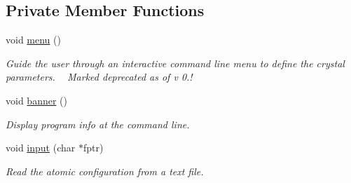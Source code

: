 \subsection*{Private Member Functions}
\begin{DoxyCompactItemize}
\item 
void \hyperlink{class_i_n_t_e_r_f_a_c_e_a4ae48a495e45c6a6a60cd3807209c851}{menu} ()
\begin{DoxyCompactList}\small\item\em Guide the user through an interactive command line menu to define the crystal parameters. ~\newline
Marked deprecated as of v 0.! \end{DoxyCompactList}\item 
void \hyperlink{class_i_n_t_e_r_f_a_c_e_a2e2b70933b201b9f06ef12fc0f126035}{banner} ()
\begin{DoxyCompactList}\small\item\em Display program info at the command line. \end{DoxyCompactList}\item 
void \hyperlink{class_i_n_t_e_r_f_a_c_e_ae27d0174983d1e7fee1291e53858dc55}{input} (char $\ast$fptr)
\begin{DoxyCompactList}\small\item\em Read the atomic configuration from a text file. \end{DoxyCompactList}\end{DoxyCompactItemize}
